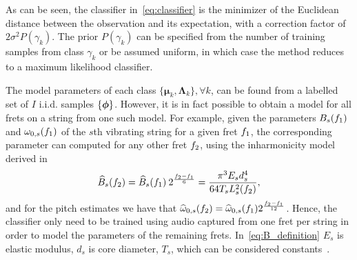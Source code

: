 \documentclass{article}
\begin{document}
As can be seen, the classifier in~\eqref{eq:classifier} is the minimizer of the Euclidean distance between the observation and its expectation, with a correction factor of $2\sigma^2 P(\gamma_k)$. The prior $P(\gamma_k)$ can be specified from the number of training samples from class $\gamma_k$ or be assumed uniform, in which case the method reduces to a maximum likelihood classifier. 
%
%
%
%
%
%

The model parameters of each class $\{\boldsymbol{\mu}_k, \boldsymbol{\Lambda}_k\}, \forall k$, can be found from a labelled set of $I$ i.i.d. samples $\{\text{\boldmath$\phi$}\}$. %
However, it is in fact possible to obtain a model for all frets on a string from one such model. For example, given the parameters $B_s( f_1 )$ and $\omega_{0,s}( f_1 )$ of the $s$th vibrating string for a given fret $f_1$, the corresponding parameter can computed for any other fret $f_2$, using the inharmonicity model derived in~\cite{barbancho:inharmonicity_tablature}
\begin{equation}\label{eq:B_definition}
    \widehat{B}_s( f_2 ) =  \widehat{B}_s( f_1 ) \: 2^{ \frac{  f_2 - f_1 }{ 6 }} = \frac{ \pi^3 E_s d_s^4 }{ 64 T_s L^2_{s}(f_2) },
\end{equation}
and for the pitch estimates we have that
  $\widehat{\omega}_{0,s}( f_2 ) =  \widehat{\omega}_{0,s}( f_1 ) 2^{\frac{f_2-f_1}{12}}$.
Hence, the classifier only need to be trained using audio captured from one fret per string in order to model the parameters of the remaining frets. In~\eqref{eq:B_definition} $E_s$ is elastic modulus, $d_s$ is core diameter, $T_s$, which can be considered constants~\cite{rossing:science_of_string_instruments}. %
\vspace{-.8mm}
\end{document}
